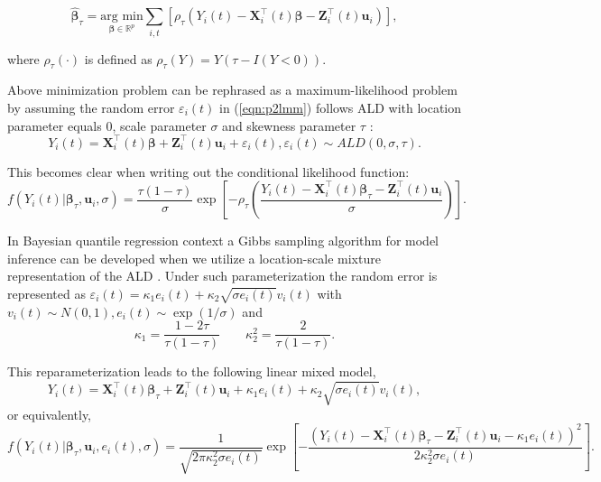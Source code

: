 \begin{equation*}\label{eqn:p2loss_fun}
\hat{\boldsymbol{\beta}}_{\tau}=\underset{\boldsymbol{\beta}\in \mathbb{R}^{p}}{\mbox{arg min}}\sum_{i, t}\left[\rho_{\tau}\left(Y_{i}(t)-{\boldsymbol X}_{i}^{\top}(t)\boldsymbol{\beta} - {\boldsymbol Z}_{i}^{\top}(t)\boldsymbol{u}_i\right)\right],
\end{equation*}

\noindent where $\rho_{\tau}(\cdot)$ is defined as $\rho_{\tau}(Y)=Y(\tau-{I}{(Y<0)}).$

Above minimization problem can be rephrased as a maximum-likelihood problem by assuming the random error $\varepsilon_{i}(t)$ in (\ref{eqn:p2lmm}) follows ALD with location parameter equals 0, scale parameter $\sigma$ and skewness parameter $\tau$ \citep{koenker1999goodness,yu2001bayesian}:
\begin{equation*}
Y_{i}(t) ={\boldsymbol X}_{i}^{\top}(t) \boldsymbol{\beta}+ {\boldsymbol Z}_{i}^{\top}(t)\boldsymbol{u}_i + \varepsilon_{i}(t), \varepsilon_{i}(t)\sim ALD(0, \sigma, \tau).
\end{equation*}

This becomes clear when writing out the conditional likelihood function:
\begin{equation*}\label{eqn:p2ald_lqmm}
f(Y_{i}(t)|\boldsymbol{\beta}_{\tau},\boldsymbol{u}_i,\sigma)=\frac{\tau(1-\tau)}{\sigma}\exp\left[-\rho_{\tau}\left(\frac{Y_{i}(t)-{\boldsymbol X}_{i}^{\top}(t)\boldsymbol{\beta}_{\tau}-{\boldsymbol Z}_{i}^{\top}(t)\boldsymbol{u}_i}{\sigma}\right)\right].
\end{equation*}

In Bayesian quantile regression context a Gibbs sampling algorithm for model inference can be developed when we utilize a location-scale mixture representation of the ALD \citep{kotz2001laplace}. Under such parameterization the random error is represented as $\varepsilon_{i}(t)=\kappa_1e_{i}(t)+\kappa_2\sqrt{\sigma e_{i}(t)}v_{i}(t)$ with $v_{i}(t)\sim N(0,1), e_{i}(t)\sim\exp(1/\sigma)$ and
\[\kappa_1=\frac{1-2\tau}{\tau(1-\tau)}\hspace{2em} \kappa_2^2=\frac{2}{\tau(1-\tau)}.\]


This reparameterization leads to the following linear mixed model,
\begin{equation*}\label{eqn:p2reformald2}
Y_{i}(t)={\boldsymbol X}_{i}^{\top}(t)\boldsymbol{\beta}_{\tau}+{\boldsymbol Z}_{i}^{\top}(t)\boldsymbol{u}_i+\kappa_1e_{i}(t)+\kappa_2\sqrt{\sigma e_{i}(t)}v_{i}(t),
\end{equation*}
\noindent or equivalently,
{\small
\begin{equation}\label{eqn:p2lo_sc_lh}
f(Y_{i}(t)|\boldsymbol{\beta}_{\tau},\boldsymbol{u}_i,e_{i}(t),\sigma)=\frac{1}{\sqrt{2\pi\kappa_2^2\sigma e_{i}(t)}}\exp\left[-\frac{(Y_{i}(t)-{\boldsymbol X}_{i}^{\top}(t)\boldsymbol{\beta}_{\tau}-{\boldsymbol Z}_{i}^{\top}(t)\boldsymbol{u}_i-\kappa_1e_{i}(t))^2}{2\kappa_2^2\sigma e_{i}(t)}\right].
\end{equation}
}

